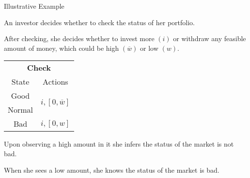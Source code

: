 \documentclass[usenames,dvipsnames,aspectratio=169,11pt, envcountsect]{beamer}
\begin{document}
\begin{frame}{Illustrative Example}

	An investor decides whether to check the status of her portfolio.

	\vfill

	After checking, she decides whether to invest more \( \left( i \right) \) or withdraw any feasible amount of money, which could be high \( \left( \overline{w} \right) \) or low \( \left( w \right) \).

	\vfill

	\begin{table}[H]
		\centering
		\begin{minipage}{0.29\textwidth}

		\end{minipage}\hspace{0.3cm} %
		\begin{minipage}{0.29\textwidth}
			\centering
			\begin{tabular}{c | c}
				\multicolumn{2}{c}{\textbf{Check}}                                                                            \\
				State                        & Actions                                                                        \\
				\hline
				{\color{bleudefrance}Good}   & \multirow{2}{*}{{\color{bleudefrance}\( i, \left[ 0, \overline{w} \right] \)}} \\
				{\color{bleudefrance}Normal} &                                                                                \\
				Bad                          & \(  i, \left[0, w \right] \)                                                   \\
			\end{tabular}
			\vspace{0.5cm} %
		\end{minipage}\hspace{0.3cm} %
		\begin{minipage}{0.29\textwidth}

		\end{minipage}
	\end{table} \pause

	\vfill

	Upon observing a high amount in it she infers the status of the market is not bad.

	\vfill

	When she sees a low amount, she knows the status of the market is bad.

\end{frame}
\end{document}
